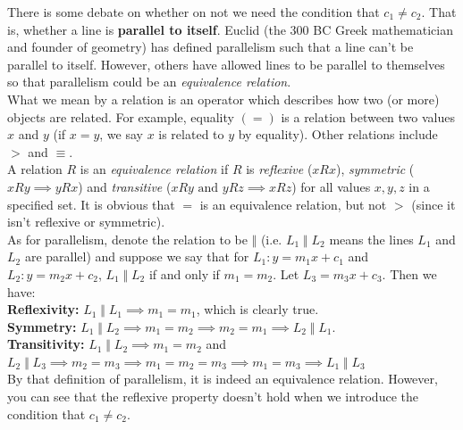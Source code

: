 \documentclass[12pt, a4paper, titlepage, twoside]{article}
\begin{document}
	\begin{fr}
		There is some debate on whether on not we need the condition that $c_1 \neq c_2$. That is, whether a line is \textbf{parallel to itself}.
		Euclid (the 300 BC Greek mathematician and founder of geometry) has defined parallelism such that a line can't be parallel to itself. 
		However, others have allowed lines to be parallel to themselves so that parallelism could be an \textit{equivalence relation}. \\
		
		What we mean by a relation is an operator which describes how two (or more) objects are related. For example, equality $(=)$ is a 
		relation between two values $x$ and $y$ (if $x=y$, we say $x$ is related to $y$ by equality). Other relations include $>$ and 
		$\equiv$.\\
		
		A relation $R$ is an \textit{equivalence relation} if $R$ is \textit{reflexive} ($xRx$), \textit{symmetric} ($xRy \implies yRx$) and 
		\textit{transitive} ($xRy \text{ and } yRz \implies xRz$) for all values $x,y,z$ in a specified set. It is obvious that $=$ is an equivalence 
		relation, but not $>$ (since it isn't reflexive or symmetric).\\
		
		As for parallelism, denote the relation to be $\Vert$ (i.e. $L_1 \; \Vert \; L_2$ means the lines $L_1$ and $L_2$ are parallel) and
		suppose we say that for $L_1: y = m_1 x + c_1$ and $L_2: y = m_2 x + c_2$, $L_1 \; \Vert \; L_2$ if and only if $m_1 = m_2$. 
		Let $L_3 = m_3 x + c_3$. Then we have:\\
		
		\textbf{Reflexivity:} $L_1 \; \Vert \; L_1 \implies m_1 = m_1$, which is clearly true.\\
		
		\textbf{Symmetry:} $L_1 \; \Vert \; L_2 \implies m_1 = m_2 \implies m_2 = m_1 \implies L_2 \; \Vert \; L_1$.\\
		
		\textbf{Transitivity:} $L_1 \; \Vert \; L_2 \implies m_1 = m_2$ and $L_2 \; \Vert \; L_3 \implies m_2 = m_3 \implies
		m_1 = m_2 = m_3 \implies m_1 = m_3 \implies L_1 \; \Vert \; L_3$\\
		
		By that definition of parallelism, it is indeed an equivalence relation. However, you can see that the reflexive property doesn't
		hold when we introduce the condition that $c_1 \neq c_2$.
	\end{fr}
	
\end{document}
